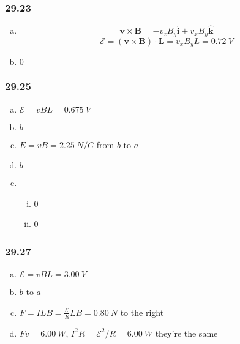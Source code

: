 \documentclass{article}
\begin{document}
\subsubsection{29.23}

\begin{enumerate}[(a)]
  \item \[\mathbf{v} \times \mathbf{B} = -v_z B_y \hat{\mathbf{i}} + v_x B_y \hat{\mathbf{k}}\] \[\mathcal{E} = (\mathbf{v} \times \mathbf{B}) \cdot \mathbf{L} = v_x B_y L = \qty{0.72}{V}\]

  \item $0$
\end{enumerate}

\subsubsection{29.25}

\begin{enumerate}[(a)]
  \item $\mathcal{E} = v B L = \qty{0.675}{V}$

  \item $b$

  \item $E = v B = \qty{2.25}{N/C}$ from $b$ to $a$

  \item $b$

  \item

        \begin{enumerate}[(i)]
          \item 0

          \item 0
        \end{enumerate}
\end{enumerate}

\subsubsection{29.27}

\begin{enumerate}[(a)]
  \item $\mathcal{E} = v B L = \qty{3.00}{V}$

  \item $b$ to $a$

  \item $F = I L B = \frac{\mathcal{E}}{R} L B = \qty{0.80}{N}$ to the right

  \item $F v = \qty{6.00}{W}$, $I^2 R = \mathcal{E}^2 / R = \qty{6.00}{W}$ they're the same
\end{enumerate}
\end{document}
